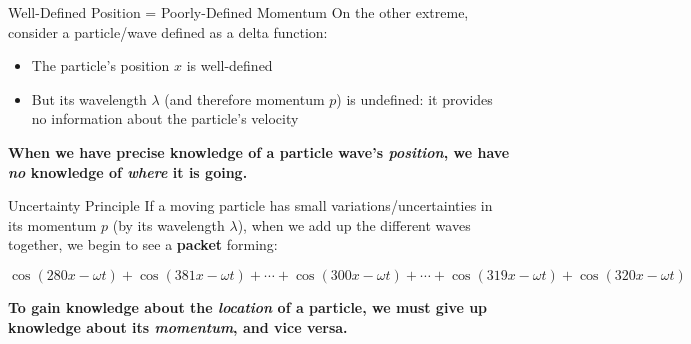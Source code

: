 \documentclass[12pt,compress,aspectratio=169]{beamer}
\begin{document}
\begin{frame}{Well-Defined Position = Poorly-Defined Momentum}
  On the other extreme, consider a particle/wave defined as a delta function:
  \begin{center}
  \end{center}
  \begin{itemize}
  \item\vspace{-.4in}The particle's position $x$ is well-defined
  \item But its wavelength $\lambda$ (and therefore momentum $p$) is undefined:
    it provides no information about the particle's velocity
  \end{itemize} 
  \textbf{When we have precise knowledge of a particle wave's \emph{position},
    we have \emph{no} knowledge of \emph{where} it is going.}
\end{frame}



\begin{frame}{Uncertainty Principle}
  If a moving particle has small variations/uncertainties in its momentum $p$
  (by its wavelength $\lambda$), when we add up the different waves together, we
  begin to see a \textbf{packet} forming:
  \begin{center}
    {\footnotesize
      $\cos(280x-\omega t)+\cos(381x-\omega t)+\cdots+\cos(300x-\omega t)+
      \cdots+\cos(319x-\omega t)+\cos(320x-\omega t)$}\\
  \end{center}
  \textbf{To gain knowledge about the \emph{location} of a particle, we must
    give up knowledge about its \emph{momentum}, and vice versa.}
\end{frame}
\end{document}
